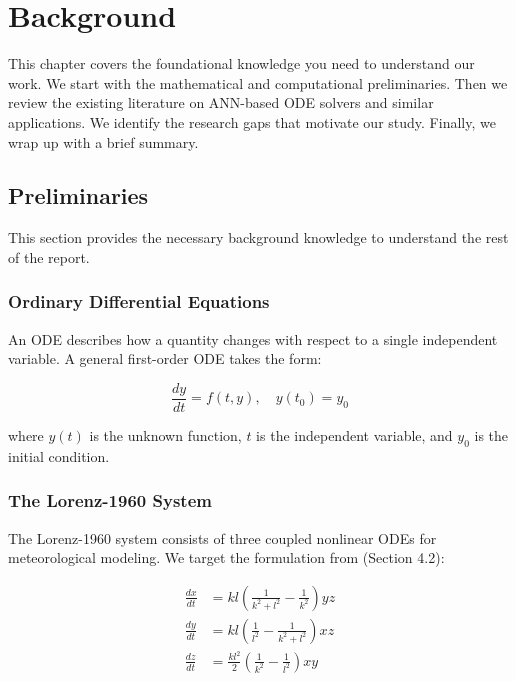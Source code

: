 \chapter{Background}

This chapter covers the foundational knowledge you need to understand our work. We start with the mathematical and computational preliminaries. Then we review the existing literature on ANN-based ODE solvers and similar applications. We identify the research gaps that motivate our study. Finally, we wrap up with a brief summary.

\section{Preliminaries}

This section provides the necessary background knowledge to understand the rest of the report.

\subsection{Ordinary Differential Equations}

An ODE describes how a quantity changes with respect to a single independent variable. A general first-order ODE takes the form:

\begin{equation}
\frac{dy}{dt} = f(t, y), \quad y(t_0) = y_0
\label{eq:first_order_ode}
\end{equation}

where $y(t)$ is the unknown function, $t$ is the independent variable, and $y_0$ is the initial condition.

\subsection{The Lorenz-1960 System}

The Lorenz-1960 system consists of three coupled nonlinear ODEs for meteorological modeling. We target the formulation from \cite{matthews2024pinnde} (Section 4.2):

\begin{equation}
\begin{aligned}
\frac{dx}{dt} &= kl\left(\frac{1}{k^2 + l^2} - \frac{1}{k^2}\right) yz \\
\frac{dy}{dt} &= kl\left(\frac{1}{l^2} - \frac{1}{k^2 + l^2}\right) xz \\
\frac{dz}{dt} &= \frac{kl^2}{2}\left(\frac{1}{k^2} - \frac{1}{l^2}\right) xy
\end{aligned}
\label{eq:lorenz1960}
\end{equation}

